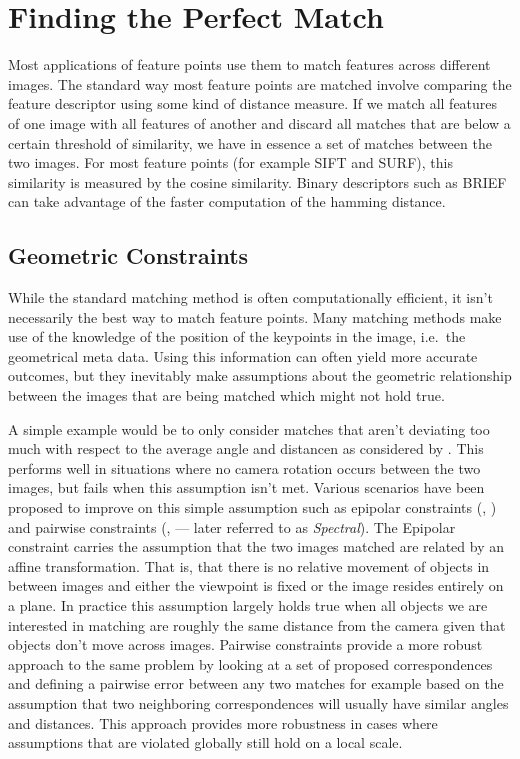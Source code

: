 \section{Finding the Perfect Match}

Most applications of feature points use them to match features across 
different images. The standard way most feature points are matched 
involve comparing the feature descriptor using some kind of distance 
measure. If we match all features of one image with all features of 
another and discard all matches that are below a certain threshold of 
similarity, we have in essence a set of matches between the
two images. For most feature points (for example SIFT and SURF), this 
similarity is measured by the cosine similarity. Binary descriptors such
as BRIEF can take advantage of the faster computation of the hamming 
distance.

\subsection{Geometric Constraints}

While the standard matching method is often computationally efficient, 
it isn't necessarily the best way to match feature points. Many matching 
methods make use of the knowledge of the position of the keypoints in 
the image, i.e.\ the geometrical meta data. Using this information can 
often yield more accurate outcomes, but they inevitably make assumptions
about the geometric relationship between the images that are being 
matched which might not hold true.  

A simple example would be to only consider matches that aren't deviating 
too much with respect to the average angle and distancen as considered 
by \cite{kim2008efficient}.  This performs well in situations where no 
camera rotation occurs between the two images, but fails when this 
assumption isn't met. Various scenarios have been proposed to improve on 
this simple assumption such as epipolar constraints 
(\cite{torr2000mlesac}, \cite{chum2005matching}) and pairwise 
constraints (\cite{choi2009robust}, \cite{leordeanu2005spectral} --- 
later referred to as \emph{Spectral}).  The Epipolar constraint carries 
the assumption that the two images matched are related by an affine 
transformation.  That is, that there is no relative movement of objects 
in between images and either the viewpoint is fixed or the image resides 
entirely on a plane.  In practice this assumption largely holds true 
when all objects we are interested in matching are roughly the same 
distance from the camera given that objects don't move across images.  
Pairwise constraints provide a more robust approach to the same problem 
by looking at a set of proposed correspondences and defining a pairwise 
error between any two matches for example based on the assumption that 
two neighboring correspondences will usually have similar angles and 
distances. This approach provides more robustness in cases where 
assumptions that are violated globally still hold on a local scale.

